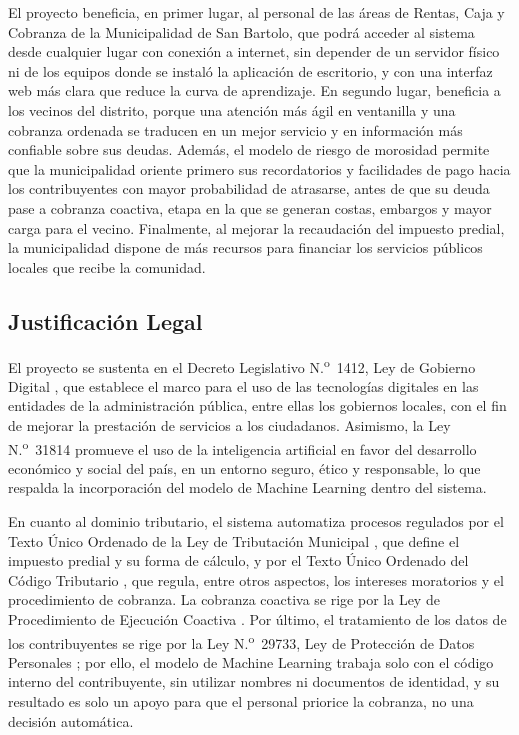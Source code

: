 \documentclass[12pt,a4paper]{report}
\begin{document}
El proyecto beneficia, en primer lugar, al personal de las áreas de Rentas, Caja y Cobranza de la Municipalidad de San Bartolo, que podrá acceder al sistema desde cualquier lugar con conexión a internet, sin depender de un servidor físico ni de los equipos donde se instaló la aplicación de escritorio, y con una interfaz web más clara que reduce la curva de aprendizaje. En segundo lugar, beneficia a los vecinos del distrito, porque una atención más ágil en ventanilla y una cobranza ordenada se traducen en un mejor servicio y en información más confiable sobre sus deudas. Además, el modelo de riesgo de morosidad permite que la municipalidad oriente primero sus recordatorios y facilidades de pago hacia los contribuyentes con mayor probabilidad de atrasarse, antes de que su deuda pase a cobranza coactiva, etapa en la que se generan costas, embargos y mayor carga para el vecino. Finalmente, al mejorar la recaudación del impuesto predial, la municipalidad dispone de más recursos para financiar los servicios públicos locales que recibe la comunidad.

\subsection{Justificación Legal}

El proyecto se sustenta en el Decreto Legislativo N.\textsuperscript{o}~1412, Ley de Gobierno Digital \parencite{dleg1412}, que establece el marco para el uso de las tecnologías digitales en las entidades de la administración pública, entre ellas los gobiernos locales, con el fin de mejorar la prestación de servicios a los ciudadanos. Asimismo, la Ley N.\textsuperscript{o}~31814 \parencite{ley31814} promueve el uso de la inteligencia artificial en favor del desarrollo económico y social del país, en un entorno seguro, ético y responsable, lo que respalda la incorporación del modelo de Machine Learning dentro del sistema.

En cuanto al dominio tributario, el sistema automatiza procesos regulados por el Texto Único Ordenado de la Ley de Tributación Municipal \parencite{tuoltm}, que define el impuesto predial y su forma de cálculo, y por el Texto Único Ordenado del Código Tributario \parencite{codigotributario}, que regula, entre otros aspectos, los intereses moratorios y el procedimiento de cobranza. La cobranza coactiva se rige por la Ley de Procedimiento de Ejecución Coactiva \parencite{ley26979}. Por último, el tratamiento de los datos de los contribuyentes se rige por la Ley N.\textsuperscript{o}~29733, Ley de Protección de Datos Personales \parencite{ley29733}; por ello, el modelo de Machine Learning trabaja solo con el código interno del contribuyente, sin utilizar nombres ni documentos de identidad, y su resultado es solo un apoyo para que el personal priorice la cobranza, no una decisión automática.
\end{document}
